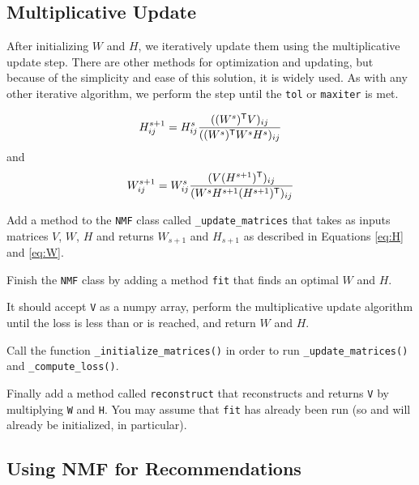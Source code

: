 \subsection*{Multiplicative Update}
After initializing $W$ and $H$, we iteratively update them using the multiplicative update step. 
There are other methods for optimization and updating, but because of the simplicity and ease of this solution, it is widely used.
As with any other iterative algorithm, we perform the step until the \texttt{tol} or \texttt{maxiter} is met.

\begin{equation}
H^{s+1}_{ij} = H^{s}_{ij} \frac{((W^s)^{\mathsf T}  V)_{ij}}{((W^{s})^{\mathsf T} W^sH^s)_{ij}} 
\label{eq:H}
\end{equation}
and
\begin{equation}
W^{s+1}_{ij} = W^{s}_{ij} \frac{(V(H^{s+1})^{\mathsf T} )_{ij}}{(W^{s}H^{s+1}(H^{s+1})^{\mathsf T} )_{ij}}
\label{eq:W}
\end{equation}



\begin{problem}
Add a method to the \texttt{NMF} class called \texttt{\_update\_matrices} that takes as inputs matrices $V$, $W$, $H$ and returns $W_{s+1}$ and $H_{s+1}$ as described in Equations \ref{eq:H} and \ref{eq:W}.
\end{problem}

\begin{problem}
Finish the \texttt{NMF} class by adding a method \texttt{fit} that finds an optimal $W$ and $H$. 

It should accept \texttt{V} as a numpy array, perform the multiplicative update algorithm until the loss is less than  or  is reached, and return $W$ and $H$. 

Call the function \texttt{\_initialize\_matrices()} in order to run \texttt{\_update\_matrices()} and \texttt{\_compute\_loss()}.

Finally add a method called \texttt{reconstruct} that reconstructs and returns \texttt{V} by multiplying \texttt{W} and \texttt{H}. You may assume that \texttt{fit} has already been run (so  and  will already be initialized, in particular).  
\end{problem}

\subsection*{Using NMF for Recommendations}

